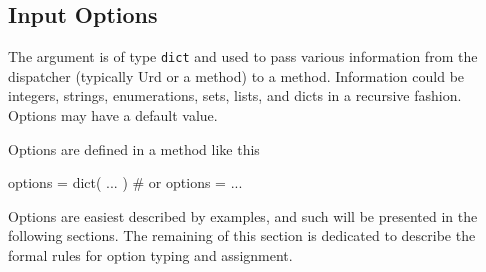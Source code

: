 \subsection{Input Options}

The \options argument is of type \texttt{dict} and used to pass
various information from the dispatcher (typically Urd or a method) to
a method.  Information could be integers, strings, enumerations, sets,
lists, and dicts in a recursive fashion.  Options may have a default
value.

Options are defined in a method like this
\\
\begin{python}
  options = dict( ... )  # or
  options = { ... }
\end{python}

Options are easiest described by examples, and such will be presented
in the following sections.  The remaining of this section is dedicated
to describe the formal rules for option typing and assignment.

